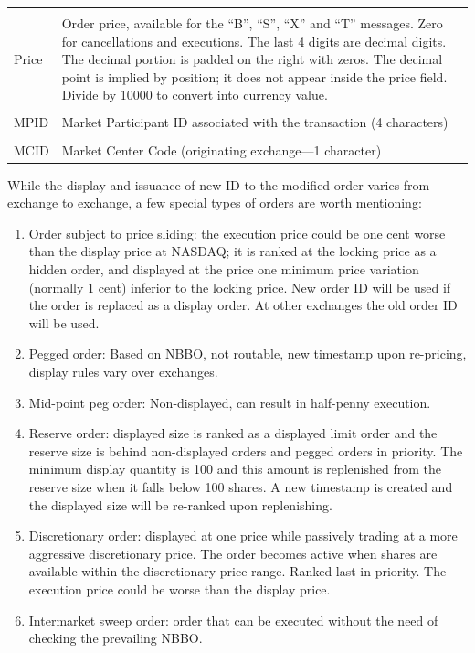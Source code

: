 \begin{table}[!ht]
\begin{tabular}{lp{}}
	& \\
	Price & Order price, available for the ``B'', ``S'', ``X'' and ``T'' messages. \newline Zero for cancellations and executions. The last 4 digits are decimal digits. The decimal portion is padded on the right with zeros. The decimal point is implied by position; it does not appear inside the price field. Divide by 10000 to convert into currency value. \\ 
	& \\
	MPID & Market Participant ID associated with the transaction (4 characters) \\
	& \\
	MCID & Market Center Code (originating exchange---1 character) 
	\end{tabular}
	\end{table}
	

While the display and issuance of new ID to the modified order varies from exchange to exchange, a few special types of orders are worth mentioning:
        \begin{enumerate}[1.]
        \item Order subject to price sliding: the execution price could be one cent worse than the display price at NASDAQ; it is ranked at the locking price as a hidden order, and displayed at the price one minimum price variation (normally 1 cent) inferior to the locking price. New order ID will be used if the order is replaced as a display order. At other exchanges the old order ID will be used.
        \item Pegged order: Based on NBBO, not routable, new timestamp upon re-pricing, display rules vary over exchanges.
        \item Mid-point peg order: Non-displayed, can result in half-penny execution.
        \item Reserve order: displayed size is ranked as a displayed limit order and the reserve size is behind non-displayed orders and pegged orders in priority. The minimum display quantity is 100 and this amount is replenished from the reserve size when it falls below 100 shares. A new timestamp is created and the displayed size will be re-ranked upon replenishing.
        \item Discretionary order: displayed at one price while passively trading at a more aggressive discretionary price. The order becomes active when shares are available within the discretionary price range. Ranked last in priority. The execution price could be worse than the display price.
        \item Intermarket sweep order: order that can be executed without the need of checking the prevailing NBBO.  
        \end{enumerate}


